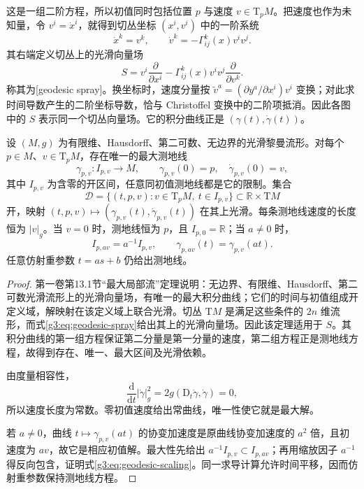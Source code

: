 这是一组二阶方程，所以初值同时包括位置 \(p\) 与速度 \(v\in\mathrm{T}_pM\)。把速度也作为未知量，令 \(v^i=\dot x^i\)，就得到切丛坐标 \((x^i,v^i)\) 中的一阶系统
\[
	\dot x^k=v^k,\qquad
	\dot v^k=-\Gamma^k_{ij}(x)v^iv^j.
\]
其右端定义切丛上的光滑向量场
\begin{equation}\label{g3:eq:geodesic-spray}
	S=v^i\frac{\partial}{\partial x^i}
	-\Gamma^k_{ij}(x)v^iv^j\frac{\partial}{\partial v^k}.
\end{equation}
称其为[geodesic spray]。换坐标时，速度分量按 \(\widetilde v^a=(\partial y^a/\partial x^i)v^i\) 变换；对此求时间导数产生的二阶坐标导数，恰与 Christoffel 变换中的二阶项抵消。因此各图中的 \(S\) 表示同一个切丛向量场。它的积分曲线正是 \((\gamma(t),\dot\gamma(t))\)。

\begin{theorem}\label{g3:thm:geodesic-ivp}
	设 \((M,g)\) 为有限维、Hausdorff、第二可数、无边界的光滑黎曼流形。对每个 \(p\in M\)、\(v\in\mathrm{T}_pM\)，存在唯一的最大测地线
	\[
		\gamma_{p,v}:I_{p,v}\longrightarrow M,\qquad
		\gamma_{p,v}(0)=p,\quad \dot\gamma_{p,v}(0)=v,
	\]
	其中 \(I_{p,v}\) 为含零的开区间，任意同初值测地线都是它的限制。集合
	\[
		\mathcal D=\{(t,p,v):v\in\mathrm{T}_pM,\ t\in I_{p,v}\}
		\subset\mathbb R\times\mathrm{T}M
	\]
	开，映射 \((t,p,v)\mapsto(\gamma_{p,v}(t),\dot\gamma_{p,v}(t))\) 在其上光滑。每条测地线速度的长度恒为 \(|v|_g\)。当 \(v=0\) 时，测地线恒为 \(p\)，且 \(I_{p,0}=\mathbb R\)；当 \(a\ne0\) 时，
	\begin{equation}\label{g3:eq:geodesic-scaling}
		I_{p,av}=a^{-1}I_{p,v},\qquad
		\gamma_{p,av}(t)=\gamma_{p,v}(at).
	\end{equation}
	任意仿射重参数 \(t=as+b\) 仍给出测地线。
\end{theorem}
\begin{proof}
	第一卷第13.1节“最大局部流”定理说明：无边界、有限维、Hausdorff、第二可数光滑流形上的光滑向量场，有唯一的最大积分曲线；它们的时间与初值组成开定义域，解映射在该定义域上联合光滑。切丛 \(\mathrm{T}M\) 是满足这些条件的 \(2n\) 维流形，而式\eqref{g3:eq:geodesic-spray}给出其上的光滑向量场。因此该定理适用于 \(S\)。其积分曲线的第一组方程保证第二分量是第一分量的速度，第二组方程正是测地线方程，故得到存在、唯一、最大区间及光滑依赖。

	由度量相容性，
	\[
		\frac{\mathrm{d}}{\mathrm{d}t}|\dot\gamma|_g^2
		=2g(\mathrm{D}_t\dot\gamma,\dot\gamma)=0,
	\]
	所以速度长度为常数。零初值速度给出常曲线，唯一性使它就是最大解。

	若 \(a\ne0\)，曲线 \(t\mapsto\gamma_{p,v}(at)\) 的协变加速度是原曲线协变加速度的 \(a^2\) 倍，且初速度为 \(av\)，故它是相应初值解。最大性先给出 \(a^{-1}I_{p,v}\subset I_{p,av}\)；再用缩放因子 \(a^{-1}\) 得反向包含，证明式\eqref{g3:eq:geodesic-scaling}。同一求导计算允许时间平移，因而仿射重参数保持测地线方程。
\end{proof}

